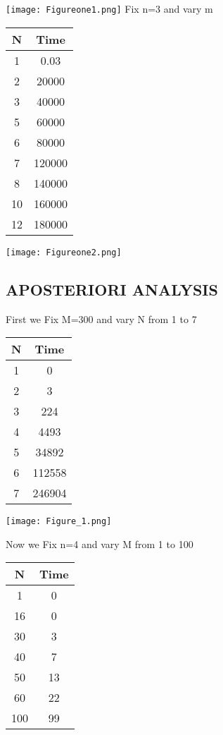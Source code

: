 \documentclass[conference]{IEEEtran}
\begin{document}
\texttt{[image: Figureone1.png]}
\newline
Fix n=3 and vary m
\newline
\begin{center}
   \begin{tabular}{|c|c|}
   \hline
   N & Time \\
   \hline\hline
    1 & 0.03 \\
    \hline
    2 & 20000 \\
    \hline
    3 & 40000 \\
    \hline
    5 & 60000 \\
    \hline
    6 & 80000 \\
    \hline
    7 & 120000 \\
    \hline
    8 & 140000 \\
    \hline
    10 & 160000 \\
    \hline
    12 & 180000 \\
    \hline
    \end{tabular} 
\end{center}
\texttt{[image: Figureone2.png]}
\newline

\subsection{APOSTERIORI ANALYSIS }

First we Fix M=300 and vary N from 1 to 7
\begin{center}
   \begin{tabular}{|c|c|}
   \hline
   N & Time \\
   \hline\hline
    1 & 0 \\
    \hline
    2 & 3 \\
    \hline
    3 & 224 \\
    \hline
    4 & 4493 \\
    \hline
    5 & 34892 \\
    \hline
    6 & 112558 \\
    \hline
    7 & 246904 \\
    \hline
    \end{tabular} 
\end{center}

\texttt{[image: Figure\_1.png]}

Now we Fix n=4 and vary M from 1 to 100

\begin{center}
   \begin{tabular}{|c|c|}
   \hline
   N & Time \\
   \hline\hline
    1 & 0 \\
    \hline
    16 & 0 \\
    \hline
    30 & 3 \\
    \hline
    40 & 7 \\
    \hline
    50 & 13 \\
    \hline
    60 & 22 \\
    \hline
    100 & 99 \\
    \hline
    \end{tabular} 
\end{center}
\end{document}
